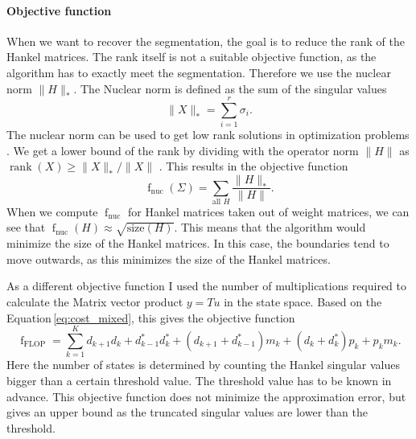 \documentclass[doctype=mastersthesis,BCOR=15mm,biblatex]{ldvbook}%
\DeclareMathOperator{\rank}{rank}
\DeclareMathOperator{\f}{f}
\newcommand{\da}{d^*} %
\begin{document}
\paragraph{Objective function}
When we want to recover the segmentation, the goal is to reduce the rank of the Hankel matrices.
The rank itself is not a suitable objective function, as the algorithm has to exactly meet the segmentation.
Therefore we use the nuclear norm $\|H\|_*$.
The Nuclear norm is defined as the sum of the singular values
\begin{equation}
	\|X\|_* = \sum_{i=1}^r \sigma_i
	.
\end{equation}
The nuclear norm can be used to get low rank solutions in optimization problems \cite{liu_interior-point_2010}.
We get a lower bound of the rank by dividing with the operator norm $\|H\|$ as $\rank(X) \geq \|X\|_*/\|X\|$ \cite{recht_guaranteed_2010}.
This results in the objective function
\begin{equation}\label{eq:objective_nuc}
	\f_{\text{nuc}}(\Sigma)= \sum_{\text{all } H} \frac{\|H\|_*}{\|H\|}
	.
\end{equation}
When we compute $\f_{\text{nuc}}$ for Hankel matrices taken out of weight matrices, we can see that $\f_{\text{nuc}}(H) \approx \sqrt{\text{size}(H)}$.
This means that the algorithm would minimize the size of the Hankel matrices.
In this case, the boundaries tend to move outwards, as this minimizes the size of the Hankel matrices.


As a different objective function I used the number of multiplications required to calculate the Matrix vector product $y=Tu$ in the state space.
Based on the Equation\,\ref{eq:cost_mixed}, this gives the objective function
\begin{equation}\label{eq:objective_flop}
\f_{\text{FLOP}} = \sum_{k=1}^Kd_{k+1}d_k + \da_{k-1}\da_k + (d_{k+1}+\da_{k-1})m_k +(d_k+\da_k)p_k +p_km_k 
.
\end{equation}
Here the number of states is determined by counting the Hankel singular values bigger than a certain threshold value. 
The threshold value has to be known in advance.
This objective function does not minimize the approximation error, but  gives an upper bound as the truncated singular values are lower than the threshold.
\end{document}
